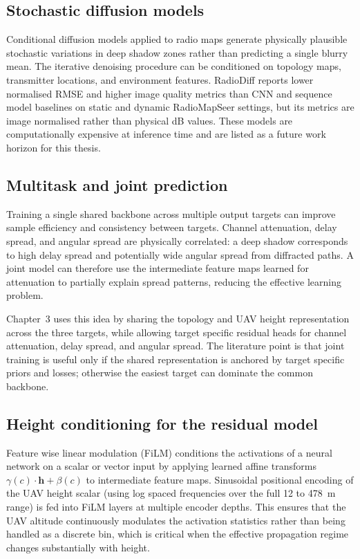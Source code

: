 \subsection{Stochastic diffusion models}

Conditional diffusion models applied to radio maps \cite{radiodiff2025} generate
physically plausible stochastic variations in deep shadow zones rather than
predicting a single blurry mean.  The iterative denoising procedure can be
conditioned on topology maps, transmitter locations, and environment features.
RadioDiff reports lower normalised RMSE and higher image quality metrics than CNN and
sequence model baselines on static and dynamic RadioMapSeer settings, but its
metrics are image normalised rather than physical dB values.  These models are
computationally expensive at inference time and are listed as a future work
horizon for this thesis.

\subsection{Multitask and joint prediction}

Training a single shared backbone across multiple output targets can improve
sample efficiency and consistency between targets.  Channel attenuation, delay spread, and
angular spread are physically correlated: a deep shadow corresponds to high
delay spread and potentially wide angular spread from diffracted paths.  A joint
model can therefore use the intermediate feature maps learned for attenuation to
partially explain spread patterns, reducing the effective learning problem.

Chapter~3 uses this idea by sharing the topology and UAV height representation
across the three targets, while allowing target specific residual heads for
channel attenuation, delay spread, and angular spread. The literature point is that joint
training is useful only if the shared representation is anchored by
target specific priors and losses; otherwise the easiest target can dominate
the common backbone.

\subsection{Height conditioning for the residual model}
\label{sec:soa_training}

\noindent
Feature wise linear modulation (FiLM) \cite{perez2018film} conditions
the activations of a neural network on a scalar or vector input by applying
learned affine transforms $\gamma(c) \cdot \textbf{h} + \beta(c)$ to
intermediate feature maps.  Sinusoidal positional encoding of the UAV height
scalar (using log spaced frequencies over the full 12 to 478~m range) is fed into
FiLM layers at multiple encoder depths.  This ensures that the UAV altitude
continuously modulates the activation statistics rather than being handled as a
discrete bin, which is critical when the effective propagation regime changes
substantially with height.

